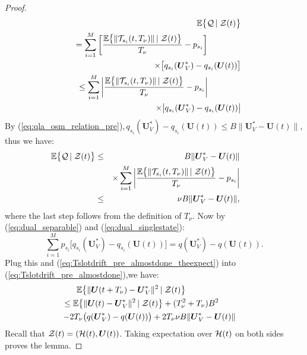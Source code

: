 \documentclass[journal]{IEEEtran}
\newcommand{\expect}[1]{\mathbb{E}\big\{#1\big\}}
\newcommand{\bv}[1]{{\boldsymbol{#1} }}
\newcommand{\script}[1]{{{\cal{#1} }}}
\begin{document}
\begin{proof}
\begin{eqnarray}
&&\hspace{-.3in}\expect{\script{Q}\left|\right. \script{Z}(t)}\nonumber\\
&&=\sum_{i=1}^{M} \bigg[\frac{\expect{\|\script{T}_{s_i}(t, T_{\nu})\|\left|\right.\script{Z}(t)}}{T_{\nu}}-p_{s_i} \bigg]\qquad\qquad\nonumber\\
&&\qquad\qquad\qquad\qquad\times\big[q_{s_i}(\bv{U}^*_V)-q_{s_i}(\bv{U}(t))\big]\nonumber\\
&&\leq \sum_{i=1}^{M} \bigg|\frac{\expect{\|\script{T}_{s_i}(t, T_{\nu})\|\left|\right.\script{Z}(t)}}{T_{\nu}}-p_{s_i} \bigg|\qquad\qquad\nonumber\\
&&\qquad\qquad\qquad\qquad\times\big|q_{s_i}(\bv{U}^*_V)-q_{s_i}(\bv{U}(t))\big|\nonumber
\end{eqnarray}
By (\ref{eq:qla_osm_relation_pre})$, q_{s_i}(\bv{U}^*_V)-q_{s_i}(\bv{U}(t))\leq B\|\bv{U}^*_V-\bv{U}(t)\|$, thus we have:
\begin{eqnarray}
\hspace{-.3in}\expect{\script{Q}\left|\right. \script{Z}(t)} &\leq&  B\|\bv{U}^*_V-\bv{U}(t)\| \nonumber\\
&&\times\sum_{i=1}^{M} \bigg|\frac{\expect{\|\script{T}_{s_i}(t, T_{\nu})\|\left|\right.\script{Z}(t)}}{T_{\nu}}-p_{s_i} \bigg|\nonumber\\
&\leq& \nu B\|\bv{U}^*_V-\bv{U}(t)\|,\label{eq:Tslotdrift_pre_almostdone_theexpect}
\end{eqnarray}
where the last step follows from the definition of $T_{\nu}$. Now by (\ref{eq:dual_separable}) and (\ref{eq:dual_singlestate}): \[\sum_{i=1}^{M}p_{s_i}\big[q_{s_i}(\bv{U}^*_V)-q_{s_i}(\bv{U}(t))\big]=q(\bv{U}^*_V)-q(\bv{U}(t)).\] 
Plug this and (\ref{eq:Tslotdrift_pre_almostdone_theexpect}) into (\ref{eq:Tslotdrift_pre_almostdone}),we have:
\begin{eqnarray*}
&&\hspace{-.6in}\expect{\|\bv{U}(t+T_{\nu})-\bv{U}^*_V\|^2\left |\right.  \script{Z}(t)}\qquad\qquad\qquad \\
&&\hspace{-.3in}\leq \expect{\|\bv{U}(t)-\bv{U}^*_V\|^2 \left|\right.  \script{Z}(t)} + (T^2_{\nu}+T_{\nu})B^2\qquad\\
&&\hspace{-.3in}-2T_{\nu}\big(q(\bv{U}^*_V)-q(\bv{U}(t))\big)+2T_{\nu} \nu B\|\bv{U}^*_V-\bv{U}(t)\|\nonumber
\end{eqnarray*}
Recall that $\script{Z}(t)=(\script{H}(t),\bv{U}(t))$. Taking expectation over $\script{H}(t)$ on both sides proves the lemma.

\end{proof}
\end{document}
